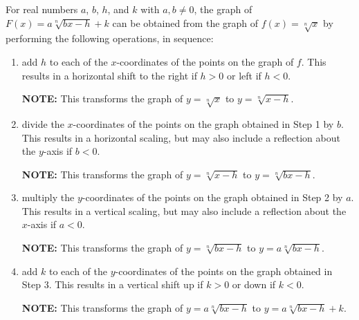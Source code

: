 \colorbox{ResultColor}{\bbm

\begin{thm} \label{linearrootgraphs}  For real numbers $a$, $b$, $h$, and $k$ with $a, b \neq 0$, the graph of $F(x) = a\sqrt[n]{bx-h} +k$  can be obtained from the graph of $f(x) = \sqrt[n]{x}$ by performing the following operations, in sequence:


\begin{enumerate}

\item  add $h$ to each of the $x$-coordinates of the points on the graph of $f$.  This results in a horizontal shift to the right if $h > 0$ or left if $h < 0$.

\textbf{NOTE:}  This transforms the graph of $y = \sqrt[n]{x}$ to $y = \sqrt[n]{x-h}$.

\item  divide the $x$-coordinates of the points on the graph obtained in Step 1 by $b$.  This results in a horizontal scaling, but may also include a reflection about the $y$-axis if $b < 0$.

\textbf{NOTE:}  This transforms the graph of $y = \sqrt[n]{x-h}$ to $y = \sqrt[n]{bx-h}$.

\item  multiply the $y$-coordinates of the points on the graph obtained in Step 2 by $a$.   This results in a vertical scaling, but may also include a reflection about the $x$-axis if $a < 0$.

\textbf{NOTE:}  This transforms the graph of $y = \sqrt[n]{bx-h}$ to $y = a\sqrt[n]{bx-h}$.

\item  add $k$ to each of the $y$-coordinates of the points on the graph obtained in Step 3.  This results in a vertical shift up if $k > 0$ or down if $k< 0$.

\textbf{NOTE:}  This transforms the graph of $y = a\sqrt[n]{bx-h}$ to $y = a\sqrt[n]{bx-h} + k$.

\end{enumerate}


\end{thm}

\ebm}

